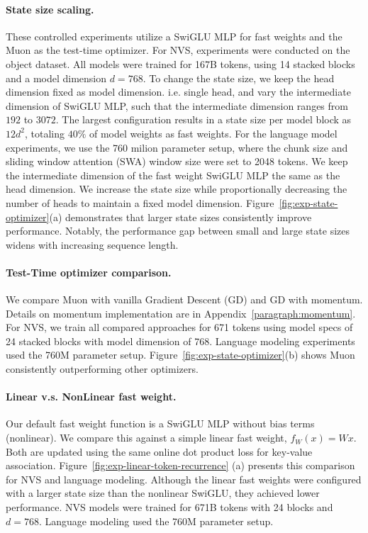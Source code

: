 \paragraph{State size scaling.} 
These controlled experiments utilize a SwiGLU MLP for fast weights and the Muon as the test-time optimizer.
For NVS, experiments were conducted on the object dataset. All models were trained for 167B tokens, using 14 stacked blocks and a model dimension $d=768$. To change the state size, we keep the head dimension fixed as model dimension. i.e. single head, and vary the intermediate dimension of SwiGLU MLP, such that the intermediate dimension ranges from $192$ to $3072$. The largest configuration results in a state size per model block as $12d^2$, totaling $40\%$ of model weights as fast weights.  For the language model experiments, we use the 760 milion parameter setup, where the chunk size and sliding window attention (SWA) window size were set to 2048 tokens. We keep the intermediate dimension of the fast weight SwiGLU MLP the same as the head dimension. We increase the state size while proportionally decreasing the number of heads to maintain a fixed model dimension. Figure~\ref{fig:exp-state-optimizer}(a) demonstrates that larger state sizes consistently improve performance. Notably, the performance gap between small and large state sizes widens with increasing sequence length.


\paragraph{Test-Time optimizer comparison. }
We compare Muon with vanilla Gradient Descent (GD) and GD with momentum. Details on momentum implementation are in Appendix~\ref{paragraph:momentum}.   For NVS, we train all compared approaches for 671 tokens using model specs of 24 stacked blocks with model dimension of 768. Language modeling experiments used the 760M parameter setup. Figure~\ref{fig:exp-state-optimizer}(b) shows Muon consistently outperforming other optimizers.


\paragraph{Linear v.s. NonLinear fast weight.} Our default fast weight function is a SwiGLU MLP without bias terms (nonlinear). We compare this against a simple linear fast weight, $f_W(x) = Wx$. Both are updated using the same online dot product loss for key-value association. Figure~\ref{fig:exp-linear-token-recurrence} (a) presents this comparison for NVS and language modeling. Although the linear fast weights were configured with a larger state size than the nonlinear SwiGLU, they achieved lower performance.  NVS models were trained for 671B tokens with 24 blocks and $d=768$.  Language modeling used the 760M parameter setup.



